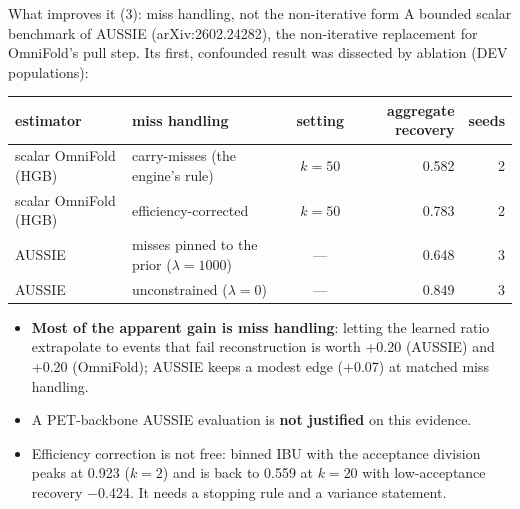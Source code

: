 \documentclass[aspectratio=169,10pt]{beamer}
\def\evidencetext{}
\begin{document}
\gdef\evidencetext{\texttt{phase\_f/results/aussie\_ablation.json}; \texttt{phase\_b/scalar/results/summary.json}}
\begin{frame}{What improves it (3): miss handling, not the non-iterative form}
{\small A bounded scalar benchmark of AUSSIE (arXiv:2602.24282), the non-iterative replacement for
OmniFold's pull step. Its first, confounded result was dissected by ablation (DEV populations):}
\begin{center}
{\footnotesize
\begin{tabular}{llcrr}
\toprule
estimator & miss handling & setting & aggregate recovery & seeds \\
\midrule
scalar OmniFold (HGB) & carry-misses (the engine's rule) & $k=50$ & 0.582 & 2 \\
scalar OmniFold (HGB) & efficiency-corrected & $k=50$ & 0.783 & 2 \\
AUSSIE & misses pinned to the prior ($\lambda=1000$) & --- & 0.648 & 3 \\
AUSSIE & unconstrained ($\lambda=0$) & --- & 0.849 & 3 \\
\bottomrule
\end{tabular}}
\end{center}
\begin{itemize}\small
\item \textbf{Most of the apparent gain is miss handling}: letting the learned ratio extrapolate to
events that fail reconstruction is worth +0.20 (AUSSIE) and +0.20
(OmniFold); AUSSIE keeps a modest edge (+0.07) at matched miss handling.
\item A PET-backbone AUSSIE evaluation is \textbf{not justified} on this evidence.
\item Efficiency correction is not free: binned IBU with the acceptance division peaks at
0.923 ($k=2$) and is back to 0.559 at $k=20$
with low-acceptance recovery \ensuremath{-}0.424. It needs a stopping rule and a variance statement.
\end{itemize}
\end{frame}
\end{document}
